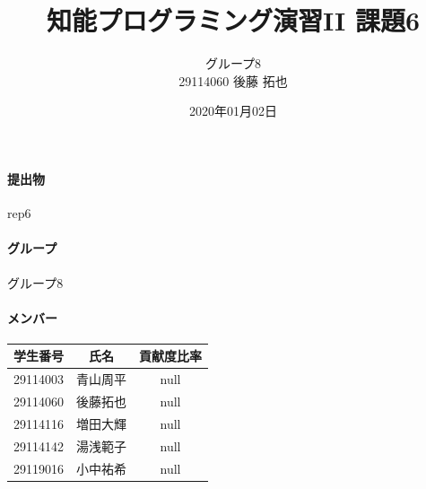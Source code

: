 \documentclass[uplatex,12pt]{jsarticle}
\title{知能プログラミング演習II 課題6}
\author{グループ8\\
  29114060 後藤 拓也\\
}
\date{2020年01月02日}
\begin{document}
\maketitle

\paragraph{提出物} rep6
\paragraph{グループ} グループ8

\paragraph{メンバー}
\begin{tabular}{|c|c|c|}
  \hline
  学生番号&氏名&貢献度比率\\
  \hline\hline
  29114003&青山周平&null\\
  \hline
  29114060&後藤拓也&null\\
  \hline
  29114116&増田大輝&null\\
  \hline
  29114142&湯浅範子&null\\
  \hline
  29119016&小中祐希&null\\
  \hline
\end{tabular}
\end{document}
